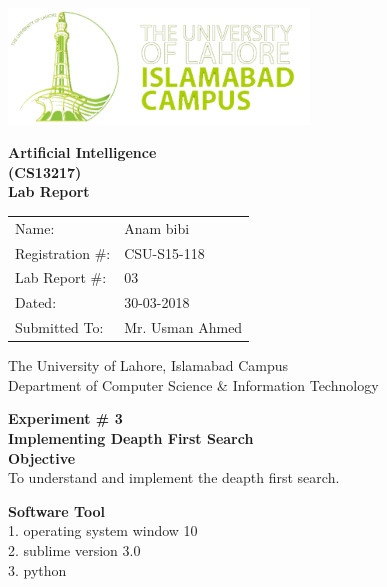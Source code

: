 \documentclass[11pt]{article}            %
\begin{document}
\begin{titlepage}
    \centering
  \vfill
    \includegraphics[width=8cm]{uni_logo.png} \\ 
	\vskip2cm
    {\bfseries\Large
	Artificial Intelligence \\ (CS13217)\\
	
	\vskip2cm
	Lab Report 
	 
	\vskip2cm
	}    

\begin{center}
\begin{tabular}{ l l  } 

Name: & Anam bibi\\ 
Registration \#: & CSU-S15-118 \\ 
Lab Report \#: & 03 \\ 
 Dated:& 30-03-2018\\ 
Submitted To:& Mr. Usman Ahmed\\ 

\end{tabular}
\end{center}
    \vfill
    The University of Lahore, Islamabad Campus\\
Department of Computer Science \& Information Technology
\end{titlepage}


    
    {\bfseries\Large
\centering
	Experiment \# 3 \\

Implementing Deapth First Search\\
	
	}    
 \vskip1cm
 \textbf {Objective}\\  To understand and implement the deapth first search.
 
 \textbf {Software Tool} \\
1.  operating system window 10\\
2.  sublime version 3.0 \\
3.  python\\
\end{document}
